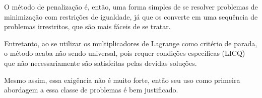 O método de penalização é, então, uma forma simples de se resolver problemas
de minimização com restrições de igualdade, já que os converte em uma sequência
de problemas irrestritos, que são mais fáceis de se tratar.

Entretanto, ao se utilizar os multiplicadores de Lagrange como critério de parada,
o método acaba não sendo universal, pois requer condições específicas (LICQ) que
não necessariamente são satisfeitas pelas devidas soluções.

Mesmo assim, essa exigência não é muito forte, então seu uso como primeira
abordagem a essa classe de problemas é bem justificado.
